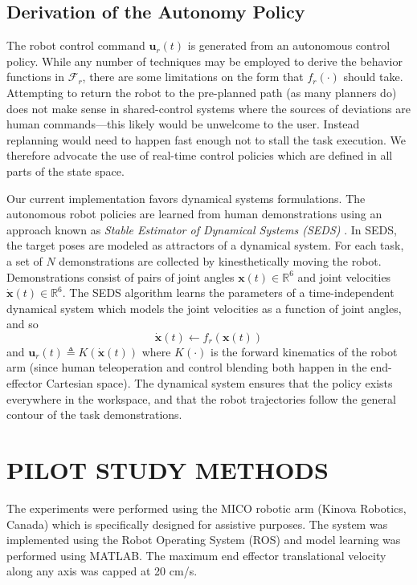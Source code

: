 \documentclass[letterpaper, 10 pt, journal, twoside]{IEEEtran}  %
\begin{document}
	\subsection{Derivation of the Autonomy Policy} \label{DRP}
	The robot control command $\boldsymbol{u}_{r}(t)$ is generated from an autonomous control policy. 
	While any number of techniques may be employed to
	derive the behavior functions in $\mathcal{F}_{r}$, there are some
	limitations on the form that $f_r(\cdot)$ should take. Attempting to return the robot to the
	pre-planned path (as many planners do) does not make sense in
	shared-control systems where the sources of deviations are human commands---this likely would be unwelcome to the
	user. Instead replanning would need to happen fast enough not to stall the task
	execution. We therefore advocate the use of real-time control
	policies which are defined in
	all parts of the state space.
	
	Our current implementation favors dynamical systems formulations.
	The autonomous robot policies are learned from human demonstrations using an approach known as \textit{Stable Estimator of Dynamical Systems (SEDS)} \cite{khansari2011learning}. In SEDS, the target poses are modeled as attractors of a dynamical system. For each task, a set of $N$ demonstrations are collected by
	kinesthetically moving the robot. Demonstrations consist of pairs of joint angles $\boldsymbol{x}(t) \in \mathbb{R}^{6}$ and joint velocities $\boldsymbol{\dot{x}}(t) \in \mathbb{R}^{6}$. The SEDS algorithm learns the parameters of a time-independent dynamical system which models the joint velocities as a function of joint angles, and so
	\begin{equation}
	\boldsymbol{\dot{x}}(t) \leftarrow f_{r}(\boldsymbol{x}(t))
	\end{equation}
	and $\boldsymbol{u}_{r}(t) \triangleq K(\boldsymbol{\dot{x}}(t))$ where $K(\cdot)$ is the forward kinematics of the robot arm (since human teleoperation and control blending both happen in the  end-effector Cartesian space). The dynamical system ensures that the policy exists everywhere in the workspace, and that the robot trajectories follow the general contour of the task demonstrations. 
	
	\section{PILOT STUDY METHODS} \label{PSM}
	
	The experiments were
	performed using the MICO robotic arm (Kinova Robotics, Canada) which
	is specifically designed for assistive purposes. The system was
	implemented using the Robot Operating System (ROS) and model learning
	was performed using MATLAB. The maximum end effector translational velocity along any axis was capped at 20 cm/s. 
\end{document}
